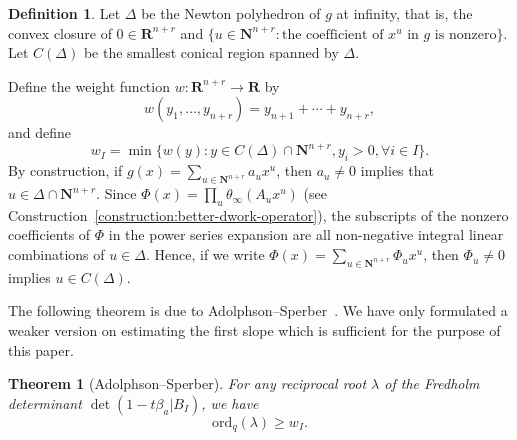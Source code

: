 \documentclass{amsart}
\numberwithin{equation}{section}
\theoremstyle{plain}
\newtheorem{theorem}[equation]{Theorem}
\theoremstyle{definition}
\newtheorem{definition}[equation]{Definition}
\renewcommand{\mathbb}{\mathbf}
\begin{document}
\begin{definition}
\label{definition:space-biprime}
Let \(\Delta\) be the Newton polyhedron of \(g\) at infinity, that is,
the convex closure of \(0 \in \mathbb{R}^{n+r}\) and
\(\{u \in \mathbb{N}^{n+r} : \text{the coefficient of }x^u\text{ in }
g \text{ is nonzero}\}\).  Let \(C(\Delta)\) be the smallest conical
region spanned by \(\Delta\).

Define the weight function
\(w\colon \mathbb{R}^{n+r}\to \mathbb{R}\) by
\[w(y_1,\ldots, y_{n+r}) =y_{n+1}+\cdots + y_{n+r},\] and define
\begin{equation*}
w_I = \min\{w(y) : y \in C(\Delta) \cap \mathbb{N}^{n+r}, y_i > 0, \forall i \in I\}.
\end{equation*}
By construction, if
\(g(x) = \sum_{u\in \mathbb{N}^{n+r}} a_{u}x^{u}\), then
\(a_{u} \neq 0\) implies that \(u \in \Delta \cap \mathbb{N}^{n+r}\).
Since \(\Phi(x) = \prod_{u} \theta_{\infty}(A_{u}x^{u})\) (see
Construction~\ref{construction:better-dwork-operator}), the subscripts
of the nonzero coefficients of \(\Phi\) in the power series expansion
are all non-negative integral linear combinations of \(u \in \Delta\).
Hence, if we write
\(\Phi(x) = \sum_{u\in \mathbb{N}^{n+r}} \Phi_{u} x^{u}\), then
\(\Phi_{u} \neq 0\) implies \(u \in C(\Delta)\).
\end{definition}

The following theorem is due to
Adolphson--Sperber~\cite[Proposition~4.2]{adolphson-sperber:chevalley-warning}.
We have only formulated a weaker version on estimating the first slope
which is sufficient for the purpose of this paper.

\begin{theorem}[Adolphson--Sperber]
\label{theorem:adolphson-sperber}
For any reciprocal root \(\lambda\) of the Fredholm
determinant \(\det(1-t\beta_{a}| B_{I})\), we have
\begin{equation*}
\mathrm{ord}_{q}(\lambda) \geq w_{I}.
\end{equation*}
\end{theorem}
\end{document}
